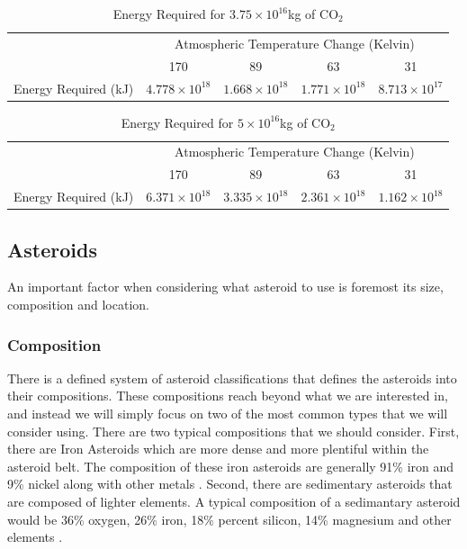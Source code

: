 \documentclass[a4paper]{article}
\begin{document}
\begin{table}[H]
\centering
\caption{Energy Required for $3.75 \times 10^{16} $kg of CO$_2$}
\begin{tabular}{|c|c|c|c|c|}
\hline
    			  & \multicolumn{4}{c|}{Atmospheric Temperature Change (Kelvin)} \\ \cline{2-5} 
   				  & 170            & 89            & 63           & 31           \\ \hline
Energy Required (kJ)&   $4. 778\times 10^{18}$             &      $1.668 \times 10^{18}$          &   $1.771 \times 10^{18}$            &   $8.713  \times 10^{17}$          \\ \hline
\end{tabular}
\end{table}

\begin{table}[H]
\centering
\caption{Energy Required for $5 \times 10^{16}$kg of CO$_2$}
\label{ENERGY}
\begin{tabular}{|c|c|c|c|c|}
\hline
    			  & \multicolumn{4}{c|}{Atmospheric Temperature Change (Kelvin)} \\ \cline{2-5} 
   				  & 170            & 89            & 63           & 31           \\ \hline
Energy Required (kJ)&   $6.371\times 10^{18}$             &      $3.335\times 10^{18}$          &   $2.361\times 10^{18}$            &   $1.162  \times 10^{18}$          \\ \hline
\end{tabular}
\end{table}

  \subsection{Asteroids}

  An important factor when considering what asteroid to use is foremost its size, composition and location.

  \subsubsection{Composition}

  There is a defined system of asteroid classifications that defines the asteroids into their compositions. These compositions reach beyond what we are interested in, and instead we will simply focus on two of the most common types that we will consider using. There are two typical compositions that we should consider. First, there are Iron Asteroids which are more dense and more plentiful within the asteroid belt. The composition of these iron asteroids are generally 91\% iron and 9\% nickel along with other metals \cite{charles_choi_asteroids:_2014}. Second, there are sedimentary asteroids that are composed of lighter elements. A typical composition of a sedimantary asteroid would be 36\% oxygen, 26\% iron, 18\% percent silicon, 14\% magnesium and other elements \cite{charles_choi_asteroids:_2014}.
\end{document}
